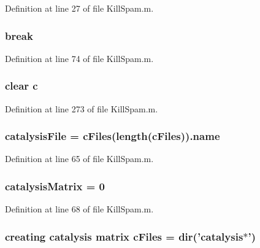 Definition at line 27 of file Kill\+Spam.\+m.

\hypertarget{a00029_a91cf6fbebedd86150a36e5ac3d5d3bfc}{
\subsubsection[{break}]{\setlength{\rightskip}{0pt plus 5cm}break}}\label{a00029_a91cf6fbebedd86150a36e5ac3d5d3bfc}


Definition at line 74 of file Kill\+Spam.\+m.

\hypertarget{a00029_a8e54ca14679a1ce9245a3b7d55d95570}{
\subsubsection[{c}]{\setlength{\rightskip}{0pt plus 5cm}clear c}}\label{a00029_a8e54ca14679a1ce9245a3b7d55d95570}


Definition at line 273 of file Kill\+Spam.\+m.

\hypertarget{a00029_a33e70cf5b45cb59005b82d30202f0b69}{
\subsubsection[{catalysis\+File}]{\setlength{\rightskip}{0pt plus 5cm}catalysis\+File = {\bf c\+Files}(length({\bf c\+Files})).{\bf name}}}\label{a00029_a33e70cf5b45cb59005b82d30202f0b69}


Definition at line 65 of file Kill\+Spam.\+m.

\hypertarget{a00029_a0810027f58d6be965e44b7b84c44ace8}{
\subsubsection[{catalysis\+Matrix}]{\setlength{\rightskip}{0pt plus 5cm}catalysis\+Matrix = 0}}\label{a00029_a0810027f58d6be965e44b7b84c44ace8}


Definition at line 68 of file Kill\+Spam.\+m.

\hypertarget{a00029_a9eab57ccb42a39c704f47dc30e4f4515}{
\subsubsection[{c\+Files}]{\setlength{\rightskip}{0pt plus 5cm}creating {\bf catalysis} matrix c\+Files = {\bf dir}('{\bf catalysis}$\ast$')}}\label{a00029_a9eab57ccb42a39c704f47dc30e4f4515}


